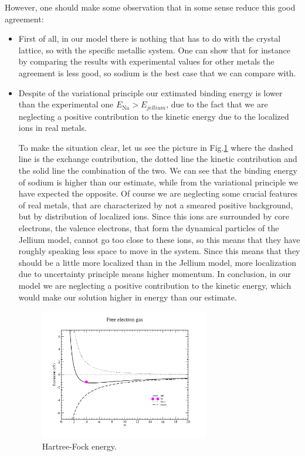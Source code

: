 \documentclass[../main/main.tex]{subfiles}
\begin{document}
However, one should make some observation that in some sense reduce this good agreement:
\begin{itemize}
\item First of all, in our model there is nothing that has to do with the crystal lattice, so with the specific metallic system. One can show that for instance by comparing the results with experimental values for other metals the agreement is less good, so sodium is the best case that we can compare with.

\item Despite of the variational principle our extimated binding energy is lower than the experimental one \( E_{\text{Na}}> E_{jellium} \), due to the fact that we are neglecting a positive contribution to the kinetic energy due to the localized ions in real metals.

To make the situation clear, let us see the picture in Fig.\ref{fig:6_5} where the dashed line is the exchange contribution, the dotted line the kinetic contribution and the solid line the combination of the two. We can see that the binding energy of sodium is higher than our estimate, while from the variational principle we have expected the opposite. Of course we are neglecting some crucial features of real metals, that are characterized by not a smeared positive background, but by distribution of localized ions.
Since this ions are surrounded by core electrons, the valence electrons, that form the dynamical particles of the Jellium model, cannot go too close to these ions, so this means that they have roughly speaking less space to move in the system. Since this means that they should be a little more localized than in the Jellium model, more localization due to uncertainty principle means higher momentum.
In conclusion, in our model we are neglecting a positive contribution to the kinetic energy, which would make our solution higher in energy than our estimate.

\begin{figure}[h!]
\centering
\includegraphics[width=0.7\textwidth]{../lessons/6_image/8.pdf}
\caption{\label{fig:6_5} Hartree-Fock energy.}
\end{figure}


\end{itemize}
\end{document}
